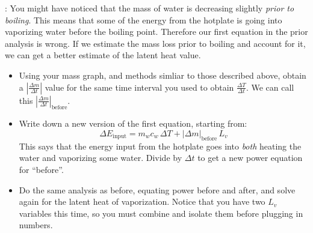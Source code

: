 : You might have noticed that the mass of water is decreasing slightly {\em prior to boiling}.  This means that some of the energy from the hotplate is going into vaporizing water before the boiling point.  Therefore our first equation in the prior analysis is wrong.  If we estimate the mass loss prior to boiling and account for it, we can get a better estimate of the latent heat value.
	\begin{itemize} 
	\item Using your mass graph, and methods simliar to those described above, obtain a $\left| \frac{\Delta m}{\Delta t} \right|$ value for the same time interval you used to obtain $\frac{\Delta T}{\Delta t}$.  We can call this $\left| \frac{\Delta m}{\Delta t} \right|_\text{before}$.
	\item Write down a new version of the first equation, starting from:
		\begin{equation*}
		\Delta E_\text{input} = m_w c_w \, \Delta T + \left| \Delta m \right|_\text{before} \, L_v
		\end{equation*}
	This says that the energy input from the hotplate goes into {\em both} heating the water and vaporizing some water. Divide by $\Delta t$ to get a new power equation for ``before''.
	\item Do the same analysis as before, equating power before and after, and solve again for the latent heat of vaporization.  Notice that you have two $L_v$ variables this time, so you must combine and isolate them before plugging in numbers.
	\end{itemize}






 